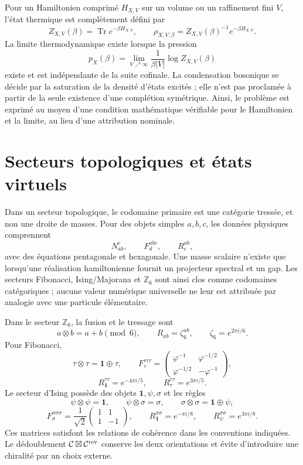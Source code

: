 Pour un Hamiltonien comprimé \(H_{X,V}\) sur un volume ou un raffinement
fini \(V\), l’état thermique est complètement défini par
\[
 Z_{X,V}(\beta)=\operatorname{Tr}e^{-\beta H_{X,V}},
 \qquad
 \rho_{X,V,\beta}=Z_{X,V}(\beta)^{-1}e^{-\beta H_{X,V}}.
\]
La limite thermodynamique existe lorsque la pression
\[
 p_X(\beta)=\lim_{V\nearrow\infty}
 \frac1{\beta |V|}\log Z_{X,V}(\beta)
\]
existe et est indépendante de la suite cofinale. La condensation bosonique se
décide par la saturation de la densité d'états excités ; elle n'est pas proclamée à
partir de la seule existence d'une complétion symétrique. Ainsi, le problème
est exprimé au moyen d'une condition mathématique vérifiable pour le
Hamiltonien et la limite, au lieu d'une attribution nominale.

\section{Secteurs topologiques et états virtuels}

Dans un secteur topologique, le codomaine primaire est une catégorie tressée, et non
une droite de masses. Pour des objets simples \(a,b,c\), les données physiques comprennent
\[
 N_{ab}^{c},\qquad F^{abc}_{d},\qquad R^{ab}_{c},
\]
avec des équations pentagonale et hexagonale. Une masse scalaire n'existe que
lorsqu'une réalisation hamiltonienne fournit un projecteur spectral et un
gap. Les secteurs Fibonacci, Ising/Majorana et \(\mathbb Z_6\) sont ainsi
clos comme codomaines catégoriques ; aucune valeur numérique universelle ne leur est attribuée
par analogie avec une particule élémentaire.

Dans le secteur \(\mathbb Z_6\), la fusion et le tressage sont
\[
 a\otimes b=a+b\pmod 6,
 \qquad
 R_{ab}=\zeta_6^{ab},
 \qquad \zeta_6=e^{2\pi i/6}.
\]
Pour Fibonacci,
\[
 \tau\otimes\tau=\mathbf 1\oplus\tau,
 \qquad
 F_\tau^{\tau\tau\tau}=
 \begin{pmatrix}
 \varphi^{-1}&\varphi^{-1/2}\\
 \varphi^{-1/2}&-\varphi^{-1}
 \end{pmatrix},
\]
\[
 R_{\mathbf1}^{\tau\tau}=e^{-4\pi i/5},
 \qquad
 R_\tau^{\tau\tau}=e^{3\pi i/5}.
\]
Le secteur d'Ising possède des objets \(\mathbf1,\psi,\sigma\) et les règles
\[
 \psi\otimes\psi=\mathbf1,
 \qquad
 \psi\otimes\sigma=\sigma,
 \qquad
 \sigma\otimes\sigma=\mathbf1\oplus\psi,
\]
\[
 F_\sigma^{\sigma\sigma\sigma}
 =\frac1{\sqrt2}
 \begin{pmatrix}1&1\\1&-1\end{pmatrix},
 \qquad
 R_{\mathbf1}^{\sigma\sigma}=e^{-\pi i/8},
 \qquad
 R_\psi^{\sigma\sigma}=e^{3\pi i/8}.
\]
Ces matrices satisfont les relations de cohérence dans les conventions
indiquées. Le dédoublement
\(\mathcal C\boxtimes\mathcal C^{\rm rev}\) conserve les deux orientations et
évite d'introduire une chiralité par un choix externe.

